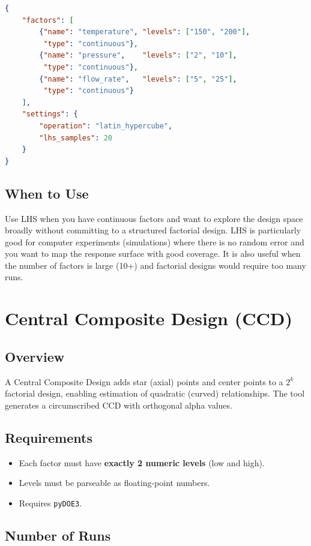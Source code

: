 \documentclass[11pt]{book}
\begin{document}
\begin{lstlisting}[language=json]
{
    "factors": [
        {"name": "temperature", "levels": ["150", "200"],
         "type": "continuous"},
        {"name": "pressure",    "levels": ["2", "10"],
         "type": "continuous"},
        {"name": "flow_rate",   "levels": ["5", "25"],
         "type": "continuous"}
    ],
    "settings": {
        "operation": "latin_hypercube",
        "lhs_samples": 20
    }
}
\end{lstlisting}

\subsection{When to Use}

Use LHS when you have continuous factors and want to explore the design space broadly without committing to a structured factorial design. LHS is particularly good for computer experiments (simulations) where there is no random error and you want to map the response surface with good coverage. It is also useful when the number of factors is large (10+) and factorial designs would require too many runs.

\section{Central Composite Design (CCD)}

\subsection{Overview}

A Central Composite Design adds star (axial) points and center points to a $2^k$ factorial design, enabling estimation of quadratic (curved) relationships. The tool generates a circumscribed CCD with orthogonal alpha values.

\subsection{Requirements}
\begin{itemize}[nosep]
  \item Each factor must have \textbf{exactly 2 numeric levels} (low and high).
  \item Levels must be parseable as floating-point numbers.
  \item Requires \texttt{pyDOE3}.
\end{itemize}

\subsection{Number of Runs}
\end{document}
